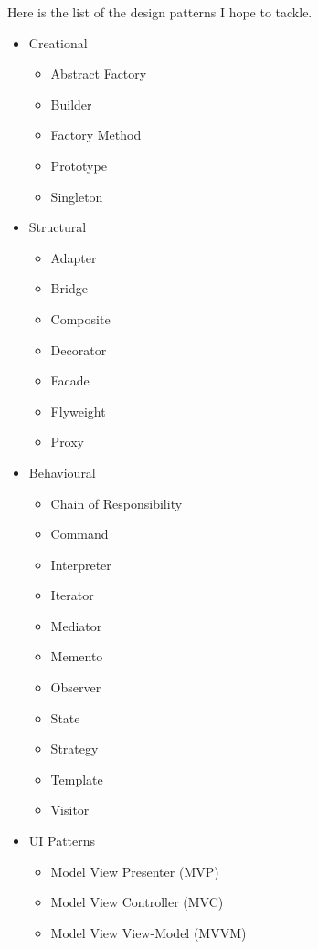 \documentclass[12pt, oneside]{book} %
\begin{document}
Here is the list of the design patterns I hope to tackle.
\begin{itemize}

\item Creational
\begin{itemize}
\item Abstract Factory
\item Builder
\item Factory Method
\item Prototype
\item Singleton
\end{itemize}

\item Structural

\begin{itemize}
\item Adapter
\item Bridge
\item Composite
\item Decorator
\item Facade
\item Flyweight
\item Proxy
\end{itemize}

\item Behavioural

\begin{itemize}
\item Chain of Responsibility
\item Command
\item Interpreter
\item Iterator
\item Mediator
\item Memento
\item Observer
\item State
\item Strategy
\item Template
\item Visitor
\end{itemize}

\item UI Patterns

\begin{itemize}
\item Model View Presenter (MVP)
\item Model View Controller (MVC)
\item Model View View-Model (MVVM)
\end{itemize}
\end{itemize}
\end{document}
